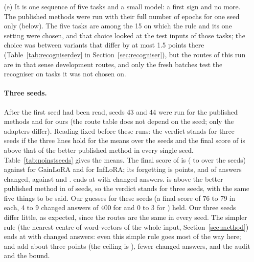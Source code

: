 (e) It is one sequence of five tasks and a small model: a first sign and no more. The published methods were run with their full number of epochs for one seed only (below). The five tasks are among the 15 on which the rule and its one setting were chosen, and that choice looked at the test inputs of those tasks; the choice was between variants that differ by at most 1.5 points there (Table~\ref{tab:recogniserdev} in Section~\ref{sec:recogniser}), but the routes of this run are in that sense development routes, and only the fresh batches test the recogniser on tasks it was not chosen on.

\paragraph{Three seeds.} After the first seed had been read, seeds 43 and 44 were run for the published methods and for ours (the route table does not depend on the seed; only the adapters differ).
Reading fixed before these runs: the verdict stands for three seeds if the three lines hold for the means over the seeds and the final score of \recog{} is above that of the better published method in every single seed.
Table~\ref{tab:noinstseeds} gives the means.
The final score of \recog{} is \AudSeedsRidgeAP{} (\AudSeedsRidgeAPLow{} to \AudSeedsRidgeAPHigh{} over the seeds) against \AudSeedsGainloraAP{} for GainLoRA and \AudSeedsInfloraAP{} for InfLoRA; its forgetting is \AudSeedsRidgeFT{} points, and \AudSeedsRidgeChanged{} of \AudSeedsCompared{} answers changed, against \AudSeedsGainloraChanged{} and \AudSeedsInfloraChanged{}.
\handicap{} ends at \AudSeedsHandicapAP{} with \AudSeedsHandicapChanged{} changed answers.
\recog{} is above the better published method in \AudSeedsRidgeAboveInAll{} of \AudSeedsN{} seeds, so the verdict stands for three seeds, with the same five things to be said.
Our guesses for these seeds (a final score of 76 to 79 in each, 4 to 9 changed answers of 400 for \recog{} and 0 to 3 for \handicap{}) held.
Our three seeds differ little, as expected, since the routes are the same in every seed.
The simpler rule \centre{} (the nearest centre of word-vectors of the whole input, Section~\ref{sec:method}) ends at \AudSeedsCentreAP{} with \AudSeedsCentreChanged{} changed answers: even this simple rule goes most of the way here; \recog{} and \handicap{} add about three points (the ceiling is \AudSeedsOwnAP{}), fewer changed answers, and the audit and the bound.

